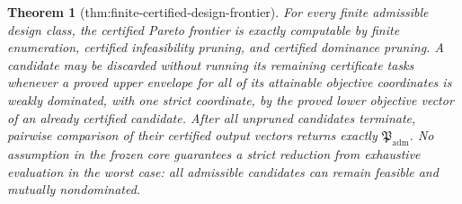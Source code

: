 \documentclass{article}
\newtheorem{theorem}{Theorem}
\begin{document}
\begin{theorem}[thm:finite-certified-design-frontier]\label{thm:finite-certified-design-frontier}
For every finite admissible design class, the certified Pareto frontier is exactly computable by finite enumeration, certified infeasibility pruning, and certified dominance pruning.  A candidate may be discarded without running its remaining certificate tasks whenever a proved upper envelope for all of its attainable objective coordinates is weakly dominated, with one strict coordinate, by the proved lower objective vector of an already certified candidate.  After all unpruned candidates terminate, pairwise comparison of their certified output vectors returns exactly \(\mathfrak P_{\mathrm{adm}}\).  No assumption in the frozen core guarantees a strict reduction from exhaustive evaluation in the worst case: all admissible candidates can remain feasible and mutually nondominated.
\end{theorem}
\end{document}
